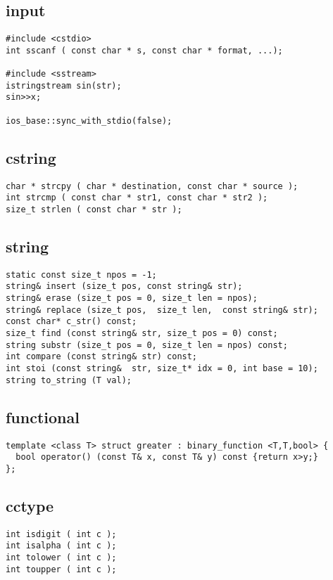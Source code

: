 \subsection*{input}
\begin{lstlisting}
#include <cstdio>
int sscanf ( const char * s, const char * format, ...);

#include <sstream>
istringstream sin(str);
sin>>x;

ios_base::sync_with_stdio(false);
\end{lstlisting}

\subsection*{cstring}
\begin{lstlisting}
char * strcpy ( char * destination, const char * source );
int strcmp ( const char * str1, const char * str2 );
size_t strlen ( const char * str );
\end{lstlisting}

\subsection*{string}
\begin{lstlisting}
static const size_t npos = -1;
string& insert (size_t pos, const string& str);
string& erase (size_t pos = 0, size_t len = npos);
string& replace (size_t pos,  size_t len,  const string& str);
const char* c_str() const;
size_t find (const string& str, size_t pos = 0) const;
string substr (size_t pos = 0, size_t len = npos) const;
int compare (const string& str) const;
int stoi (const string&  str, size_t* idx = 0, int base = 10);
string to_string (T val);
\end{lstlisting}

\subsection*{functional}
\begin{lstlisting}
template <class T> struct greater : binary_function <T,T,bool> {
  bool operator() (const T& x, const T& y) const {return x>y;}
};
\end{lstlisting}

\subsection*{cctype}
\begin{lstlisting}
int isdigit ( int c );
int isalpha ( int c );
int tolower ( int c );
int toupper ( int c );
\end{lstlisting}


